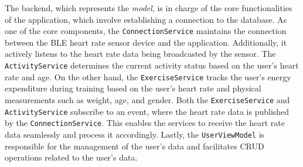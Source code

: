 The backend, which represents the \emph{model}, is in charge of the core functionalities of the application, which involve establishing a connection to the database.
As one of the core components, the \texttt{ConnectionService} maintains the connection between the BLE heart rate sensor device and the application. Additionally, it actively listens to the heart rate data being broadcasted by the sensor. 
The \texttt{ActivityService} determines the current activity status based on the user's heart rate and age. 
On the other hand, the \texttt{ExerciseService} tracks the user's energy expenditure during training based on the user's heart rate and physical measurements such as weight, age, and gender. Both the \texttt{ExerciseService} and \texttt{ActivityService} subscribe to an event, where the heart rate data is published by the \texttt{ConnectionService}. This enables the services to receive the heart rate data seamlessly and process it accordingly.
Lastly, the \texttt{UserViewModel} is responsible for the management of the user's data and facilitates CRUD operations related to the user's data.
